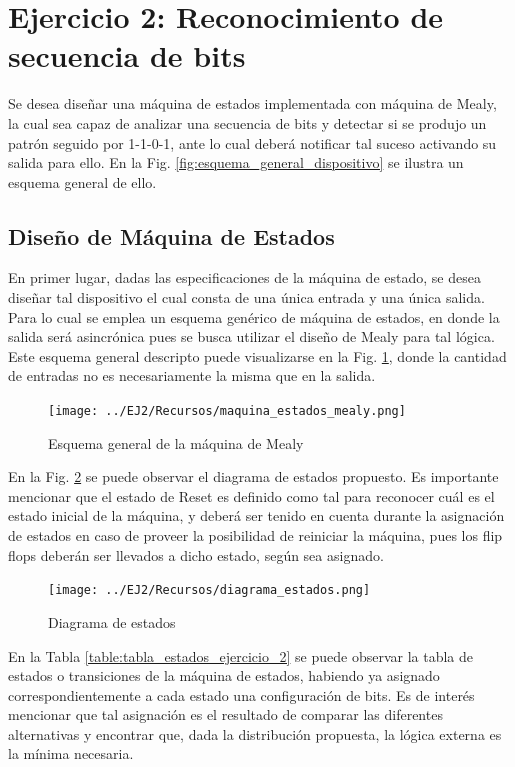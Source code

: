 \section{Ejercicio 2: Reconocimiento de secuencia de bits}
Se desea dise\~nar una m\'aquina de estados implementada con m\'aquina de Mealy, la cual sea capaz de analizar una secuencia de bits y detectar si se produjo un patr\'on
seguido por 1-1-0-1, ante lo cual deber\'a notificar tal suceso activando su salida para ello. En la Fig. \ref{fig:esquema_general_dispositivo} se ilustra un esquema general de ello.

 

\subsection{Dise\~no de M\'aquina de Estados}
En primer lugar, dadas las especificaciones de la m\'aquina de estado, se desea dise\~nar tal dispositivo el cual consta de una \'unica entrada y una \'unica salida. Para lo cual se
emplea un esquema gen\'erico de m\'aquina de estados, en donde la salida ser\'a asincr\'onica pues se busca utilizar el dise\~no de Mealy para tal l\'ogica. Este esquema general descripto
puede visualizarse en la Fig. \ref{fig:esquema_general_mealy}, donde la cantidad de entradas no es necesariamente la misma que en la salida.

\begin{figure}[H]
    \centering
    \texttt{[image: ../EJ2/Recursos/maquina\_estados\_mealy.png]}
    \caption{Esquema general de la m\'aquina de Mealy}
    \label{fig:esquema_general_mealy}
\end{figure}

En la Fig. \ref{fig:diagrama_estados_ejercicio_2} se puede observar el diagrama de estados propuesto. Es importante mencionar que el estado de Reset es definido como tal
para reconocer cu\'al es el estado inicial de la m\'aquina, y deber\'a ser tenido en cuenta durante la asignaci\'on de estados en caso de proveer la posibilidad de reiniciar la m\'aquina,
pues los flip flops deber\'an ser llevados a dicho estado, seg\'un sea asignado.

\begin{figure}[H]
    \centering
    \texttt{[image: ../EJ2/Recursos/diagrama\_estados.png]}
    \caption{Diagrama de estados}
    \label{fig:diagrama_estados_ejercicio_2}
\end{figure}

En la Tabla \ref{table:tabla_estados_ejercicio_2} se puede observar la tabla de estados o transiciones de la m\'aquina de estados, habiendo ya asignado correspondientemente a cada estado una configuraci\'on de bits. Es de inter\'es mencionar
que tal asignaci\'on es el resultado de comparar las diferentes alternativas y encontrar que, dada la distribuci\'on propuesta, la l\'ogica externa es la m\'inima necesaria.

